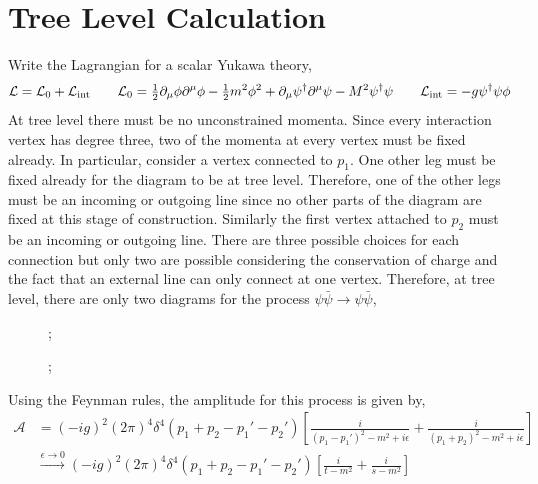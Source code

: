 \documentclass[12pt]{extarticle}
\begin{document}

\section{Tree Level Calculation}

Write the Lagrangian for a scalar Yukawa theory,
\[ \mathcal{L} = \mathcal{L}_0 + \mathcal{L}_{\mathrm{int}} \quad \quad \mathcal{L}_0 = \tfrac{1}{2} \partial_\mu \phi \partial^\mu \phi - \tfrac{1}{2} m^2 \phi^2 + \partial_\mu \psi^\dagger \partial^\mu \psi - M^2 \psi^\dagger \psi \quad \quad \mathcal{L}_{\mathrm{int}} = -g \psi^\dagger \psi \phi \] 
At tree level there must be no unconstrained momenta. Since every interaction vertex has degree three, two of the momenta at every vertex must be fixed already. In particular, consider a vertex connected to $p_1$. One other leg must be fixed already for the diagram to be at tree level. Therefore, one of the other legs must be an incoming or outgoing line since no other parts of the diagram are fixed at this stage of construction. Similarly the first vertex attached to $p_2$ must be an incoming or outgoing line. There are three possible choices for each connection but only two are possible considering the conservation of charge and the fact that an external line can only connect at one vertex. Therefore, at tree level, there are only two diagrams for the process $\psi \bar{\psi} \to \psi \bar{\psi}$,
\begin{figure}
\centering
\begin{minipage}{.5\textwidth}
  \centering
  
;

\end{minipage}%
\begin{minipage}{.5\textwidth}
  \centering
  
;

\end{minipage}
\end{figure}
Using the Feynman rules, the amplitude for this process is given by,
\begin{align*}
\mathcal{A} & = (- i g)^2 (2 \pi)^4 \delta^4(p_1 + p_2 - p_1' - p_2') \left[ \frac{i}{(p_1 - p_1')^2 - m^2 + i \epsilon} + \frac{i}{(p_1 + p_2)^2 - m^2 + i \epsilon} \right]
\\
& \xrightarrow{\epsilon \to 0} (- i g)^2 (2 \pi)^4 \delta^4(p_1 + p_2 - p_1' - p_2') \left[ \frac{i}{t - m^2} + \frac{i}{s - m^2} \right]
\end{align*}
\end{document}
